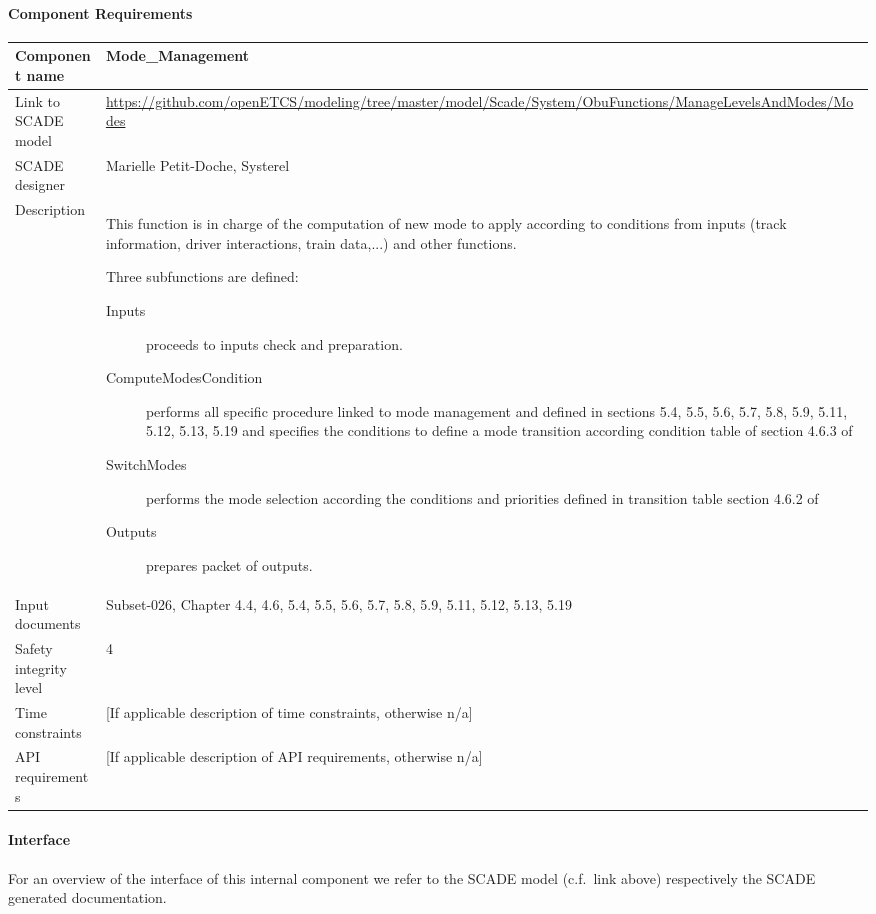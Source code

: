 
\paragraph{Component Requirements}

\begin{longtable}{p{}p{}}
\toprule
Component name			& Mode\_Management \\
\midrule
Link to SCADE model		& {\footnotesize \url{https://github.com/openETCS/modeling/tree/master/model/Scade/System/ObuFunctions/ManageLevelsAndModes/Modes}} \\
\midrule
SCADE designer			& Marielle Petit-Doche, Systerel \\
\midrule
Description				& This function is in charge of the computation of new mode to apply according to conditions from inputs (track information, driver interactions, train data,...) and other functions.

Three subfunctions are defined:
\begin{description}
\item[Inputs] proceeds to inputs check and preparation.
\item[ComputeModesCondition] performs all specific procedure linked to mode management and defined in  \citep{subset-026} sections 5.4, 5.5, 5.6, 5.7, 5.8, 5.9, 5.11, 5.12, 5.13, 5.19 and specifies the conditions to define a mode transition according condition table of section 4.6.3 of \citep{subset-026}
\item[SwitchModes] performs the mode selection according the conditions and priorities defined in transition table  section 4.6.2 of \citep{subset-026}
\item[Outputs] prepares packet of outputs.
\end{description} \\
\midrule
Input documents	& 
Subset-026, Chapter 4.4, 4.6, 5.4, 5.5, 5.6, 5.7, 5.8, 5.9, 5.11, 5.12, 5.13, 5.19 \\
\midrule
Safety integrity level		& 4 \\
\midrule
Time constraints		& [If applicable description of time constraints, otherwise n/a] \\
\midrule
API requirements 		& [If applicable description of API requirements, otherwise n/a] \\
\bottomrule
\end{longtable}


\paragraph{Interface}

For an overview of the interface of this internal component we refer to the SCADE model (c.f.~link above) respectively the SCADE generated documentation.